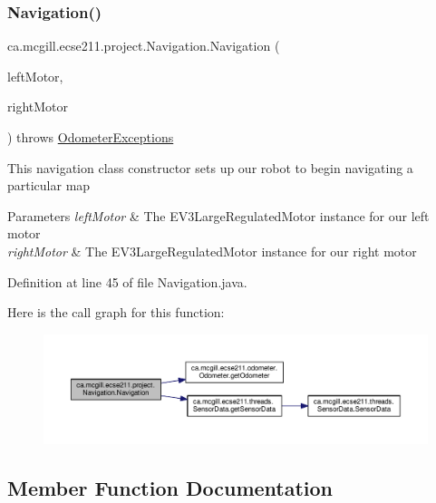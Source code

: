 \subsubsection{\texorpdfstring{Navigation()}{Navigation()}}
{\footnotesize\ttfamily ca.\+mcgill.\+ecse211.\+project.\+Navigation.\+Navigation (\begin{DoxyParamCaption}\item[{E\+V3\+Large\+Regulated\+Motor}]{left\+Motor,  }\item[{E\+V3\+Large\+Regulated\+Motor}]{right\+Motor }\end{DoxyParamCaption}) throws \hyperlink{classca_1_1mcgill_1_1ecse211_1_1odometer_1_1_odometer_exceptions}{Odometer\+Exceptions}}

This navigation class constructor sets up our robot to begin navigating a particular map


\begin{DoxyParams}{Parameters}
{\em left\+Motor} & The E\+V3\+Large\+Regulated\+Motor instance for our left motor \\
\hline
{\em right\+Motor} & The E\+V3\+Large\+Regulated\+Motor instance for our right motor \\
\hline
\end{DoxyParams}


Definition at line 45 of file Navigation.\+java.

Here is the call graph for this function\+:
\nopagebreak
\begin{figure}[H]
\begin{center}
\leavevmode
\includegraphics[width=350pt]{classca_1_1mcgill_1_1ecse211_1_1project_1_1_navigation_aaee14b67c392ddd951e3ce21224c3e56_cgraph}
\end{center}
\end{figure}


\subsection{Member Function Documentation}
\mbox{\label{classca_1_1mcgill_1_1ecse211_1_1project_1_1_navigation_a1d8075346dbc151ca366e211e9056ccc}} 
